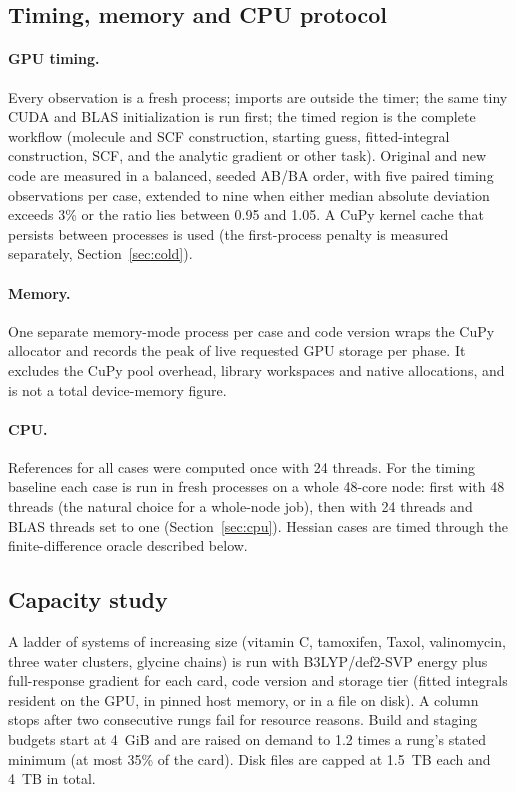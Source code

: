 \subsection{Timing, memory and CPU protocol}

\paragraph{GPU timing.} Every observation is a fresh process; imports are outside the timer; the same tiny CUDA and BLAS initialization is run first; the timed region is the complete workflow (molecule and SCF construction, starting guess, fitted-integral construction, SCF, and the analytic gradient or other task). Original and new code are measured in a balanced, seeded AB/BA order, with five paired timing observations per case, extended to nine when either median absolute deviation exceeds 3\% or the ratio lies between 0.95 and 1.05. A CuPy kernel cache that persists between processes is used (the first-process penalty is measured separately, Section~\ref{sec:cold}).

\paragraph{Memory.} One separate memory-mode process per case and code version wraps the CuPy allocator and records the peak of live requested GPU storage per phase. It excludes the CuPy pool overhead, library workspaces and native allocations, and is not a total device-memory figure.

\paragraph{CPU.} References for all cases were computed once with 24 threads. For the timing baseline each case is run in fresh processes on a whole 48-core node: first with 48 threads (the natural choice for a whole-node job), then with 24 threads and BLAS threads set to one (Section~\ref{sec:cpu}). Hessian cases are timed through the finite-difference oracle described below.

\subsection{Capacity study}

A ladder of systems of increasing size (vitamin C, tamoxifen, Taxol, valinomycin, three water clusters, glycine chains) is run with B3LYP/def2-SVP energy plus full-response gradient for each card, code version and storage tier (fitted integrals resident on the GPU, in pinned host memory, or in a file on disk). A column stops after two consecutive rungs fail for resource reasons. Build and staging budgets start at 4~GiB and are raised on demand to 1.2 times a rung's stated minimum (at most 35\% of the card). Disk files are capped at 1.5~TB each and 4~TB in total.

